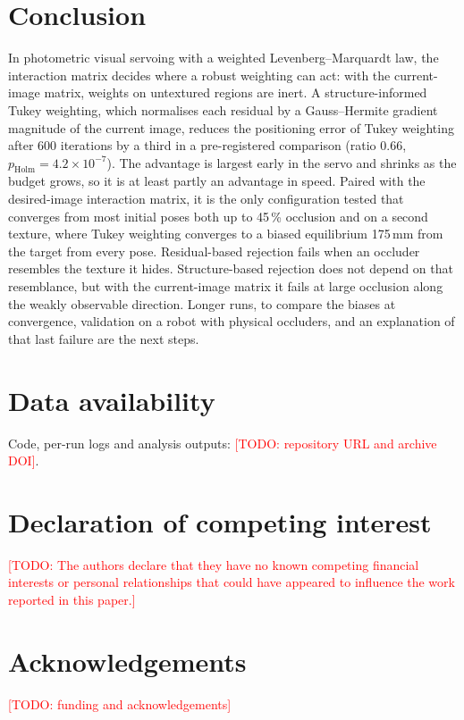 \documentclass[preprint,12pt]{elsarticle}
\theoremstyle{remark}
\newcommand{\todo}[1]{\textcolor{red}{[TODO: #1]}}
\begin{document}
\section{Conclusion}
\label{sec:conclusion}

In photometric visual servoing with a weighted Levenberg--Marquardt law, the
interaction matrix decides where a robust weighting can act: with the
current-image matrix, weights on untextured regions are inert. A
structure-informed Tukey weighting, which normalises each residual by a
Gauss--Hermite gradient magnitude of the current image, reduces the
positioning error of Tukey weighting after 600 iterations by a third in a
pre-registered comparison (ratio 0.66, $p_{\mathrm{Holm}}=4.2\times10^{-7}$).
The advantage is largest early in the servo and shrinks as the budget grows,
so it is at least partly an advantage in speed. Paired with the desired-image
interaction matrix, it is the only configuration tested that converges from
most initial poses both up to 45\,\% occlusion and on a second texture, where
Tukey weighting converges to a biased equilibrium 175\,mm from the target from
every pose. Residual-based rejection fails when an occluder resembles the
texture it hides. Structure-based rejection does not depend on that
resemblance, but with the current-image matrix it fails at large occlusion
along the weakly observable direction. Longer runs, to compare the biases
at convergence, validation on a robot with physical occluders, and an
explanation of that last failure are the next steps.

\section*{Data availability}
Code, per-run logs and analysis outputs: \todo{repository URL and archive DOI}.

\section*{Declaration of competing interest}
\todo{The authors declare that they have no known competing financial
interests or personal relationships that could have appeared to influence the
work reported in this paper.}

\section*{Acknowledgements}
\todo{funding and acknowledgements}
\end{document}
